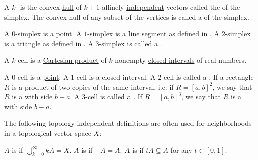 \begin{definition}\label{def:simplex}
  A \( k \)- is the convex \hyperref[def:convex_set/hull]{hull} of \( k + 1 \) affinely \hyperref[affine_independence]{independent} vectors called the  of the simplex. The convex hull of any subset of the vertices is called a  of the simplex.

  \begin{thmenum}
     A \( 0 \)-simplex is a \hyperref[def:point]{point}.
     A \( 1 \)-simplex is a line segment as defined in .
     A \( 2 \)-simplex is a triangle as defined in .
     A \( 3 \)-simplex is called a .
  \end{thmenum}
\end{definition}

\begin{definition}\label{def:k_cell}
  A \( k \)-cell is a \hyperref[def:cartesian_product]{Cartesian product} of \( k \) nonempty \hyperref[def:partially_ordered_set_interval/closed]{closed intervals} of real numbers.

  \begin{thmenum}
     A \( 0 \)-cell is a \hyperref[def:point]{point}.
     A \( 1 \)-cell is a closed interval.
     A \( 2 \)-cell is called a . If a rectangle \( R \) is a product of two copies of the same interval, i.e. if \( R = [a, b]^2 \), we say that \( R \) is a  with side \( b - a \).
     A \( 3 \)-cell is called a . If \( R = [a, b]^3 \), we say that \( R \) is a  with side \( b - a \).
  \end{thmenum}
\end{definition}

\begin{definition}\label{def:neighborhood_set_types}
  The following topology-independent definitions are often used for neighborhoods in a topological vector space \( X \):

  \begin{thmenum}
     \( A \) is  if \( \bigcup_{k=0}^\infty kA = X \).
     \( A \) is  if \( -A = A \).
     \( A \) is  if \( tA \subseteq A \) for any \( t \in [0, 1] \).
  \end{thmenum}
\end{definition}

